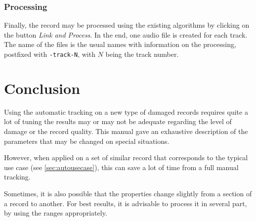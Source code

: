 \subsubsection{Processing}

Finally, the record may be processed using the existing algorithms by clicking on the button \emph{Link and Process}. In the end, one audio file is created for each track. The name of the files is the usual names with information on the processing, postfixed with \texttt{-track-N}, with $N$ being the track number.

\section{Conclusion}

Using the automatic tracking on a new type of damaged records requires quite a lot of tuning the results may or may not be adequate regarding the level of damage or the record quality. This manual gave an exhaustive description of the parameters that may be changed on special situations.

However, when applied on a set of similar record that corresponds to the typical use case (see \autoref{sec:autousecase}), this can save a lot of time from a full manual tracking.

Sometimes, it is also possible that the properties change slightly from a section of a record to another. For best results, it is advisable to process it in several part, by using the ranges appropriately.


